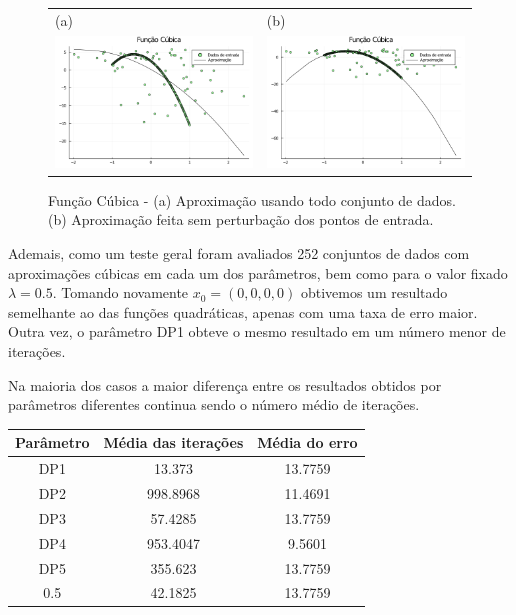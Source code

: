 \documentclass[12pt,a4paper]{article}
\begin{document}
	\begin{figure}[H]
		\centering 
		\begin{tabular}{ll}
			
			(a)& (b)   \\
			
			\includegraphics[width=0.45\linewidth]{3.png} & \includegraphics[width=0.45\linewidth]{4.png}\\ 
			
		\end{tabular}
		\caption{Função Cúbica - (a) Aproximação usando todo conjunto de dados. (b) Aproximação feita sem perturbação dos pontos de entrada.}
		\label{fig2}
	\end{figure}
	
	
	Ademais, como um teste geral foram avaliados 252 conjuntos de dados com aproximações cúbicas em cada um dos parâmetros, bem como para o valor fixado $\lambda = 0.5.$ Tomando novamente $x_0 = (0, 0, 0, 0)$ obtivemos um resultado semelhante ao das funções quadráticas, apenas com uma taxa de erro maior. Outra vez, o parâmetro DP1 obteve o mesmo resultado em um número menor de iterações.
	
	Na maioria dos casos a maior diferença entre os resultados obtidos por parâmetros diferentes continua sendo o número médio de iterações.
	
	\begin{table}[H]
		\centering
		\begin{tabular}{|c|c|c|}
			\hline
			Parâmetro & Média das iterações & Média do erro\\
			\hline
			
			DP1 & 13.373 & 13.7759\\
			\hline
			DP2 & 998.8968 & 11.4691\\ \hline
			DP3 & 57.4285 & 13.7759\\ \hline
			DP4 & 953.4047 & 9.5601\\ \hline
			DP5 & 355.623 & 13.7759\\ \hline
			0.5 & 42.1825 & 13.7759\\		\hline	
			
		\end{tabular}
	\end{table}
\end{document}
